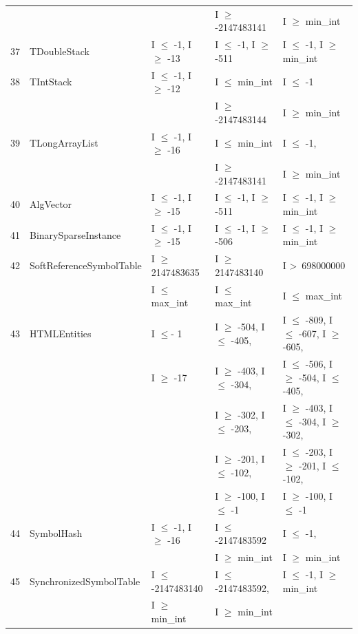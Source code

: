 \documentclass[runningheads,a4paper]{llncs}
\begin{document}
{\begin{longtable}{|l|l|l|l|l|}
	&							&								& I $\ge$ -2147483141			& I $\ge$ min\_int				\\
37	& TDoubleStack				& I $\le$ -1, I $\ge$ -13			& I $\le$ -1, I $\ge$ -511			& I $\le$ -1, I $\ge$ min\_int	\\ 
38	& TIntStack					& I $\le$ -1, I $\ge$ -12			& I $\le$ min\_int				 	& I $\le$ -1 							\\ 
	&							&								& I $\ge$ -2147483144			& I $\ge$ min\_int				\\
39	& TLongArrayList				& I $\le$ -1, I $\ge$ -16			& I $\le$ min\_int 			& I $\le$ -1, 							\\ 
	&							&								& I $\ge$ -2147483141			& I $\ge$ min\_int				\\
40	& AlgVector					& I $\le$ -1, I $\ge$ -15			& I $\le$ -1, I $\ge$ -511			& I $\le$ -1, I $\ge$ min\_int	\\ 
41	& BinarySparseInstance		& I $\le$ -1, I $\ge$ -15			& I $\le$ -1, I $\ge$ -506			& I $\le$ -1, I $\ge$ min\_int	\\ 
42	& SoftReferenceSymbolTable	& I $\ge$ 2147483635			& I $\ge$ 2147483140			& I \textgreater~698000000					\\ 
	&                                             & I $\le$ max\_int					& I $\le$ max\_int					& I $\le$ max\_int			\\
43	& HTMLEntities				& I $\le$- 1						& I $\ge$ -504, I $\le$ -405,		& I $\le$ -809, I $\le$ -607, I $\ge$ -605,    		\\ 
	&                         			& I $\ge$ -17					& I $\ge$ -403, I $\le$ -304, 		& I $\le$ -506, I $\ge$ -504, I $\le$ -405,		 \\	
	&                         			& 								& I $\ge$ -302, I $\le$ -203,		& I $\ge$ -403, I $\le$ -304, I $\ge$ -302,		 \\	
	&                        				& 								& I $\ge$ -201, I $\le$ -102, 		& I $\le$ -203, I $\ge$ -201, I $\le$ -102,		 \\	
	&                         			& 								& I $\ge$ -100, I $\le$ -1			& I $\ge$ -100, I $\le$ -1				 			 \\	
44	& SymbolHash				& I $\le$ -1,  I $\ge$ -16			& I $\le$ -2147483592			& I $\le$ -1, 							\\ 
	&							&								& I $\ge$ min\_int				& I $\ge$ min\_int				\\
45	& SynchronizedSymbolTable	& I $\le$ -2147483140			& I $\le$ -2147483592,			& I $\le$ -1, I $\ge$ min\_int	\\ 
	&                                             & I $\ge$ min\_int					& I $\ge$ min\_int	 			&  			   								\\

\end{longtable}}
\end{document}
